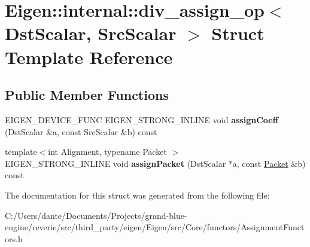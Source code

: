 \hypertarget{struct_eigen_1_1internal_1_1div__assign__op}{}\section{Eigen\+::internal\+::div\+\_\+assign\+\_\+op$<$ Dst\+Scalar, Src\+Scalar $>$ Struct Template Reference}
\label{struct_eigen_1_1internal_1_1div__assign__op}
\subsection*{Public Member Functions}
\begin{DoxyCompactItemize}
\item 
\mbox{\label{struct_eigen_1_1internal_1_1div__assign__op_a66eda20f8694f3a1c87cd6b755ccd9fc}} 
E\+I\+G\+E\+N\+\_\+\+D\+E\+V\+I\+C\+E\+\_\+\+F\+U\+NC E\+I\+G\+E\+N\+\_\+\+S\+T\+R\+O\+N\+G\+\_\+\+I\+N\+L\+I\+NE void {\bfseries assign\+Coeff} (Dst\+Scalar \&a, const Src\+Scalar \&b) const
\item 
\mbox{\label{struct_eigen_1_1internal_1_1div__assign__op_ab402e9f7ccc414aeca72663a7a7a90c8}} 
{\footnotesize template$<$int Alignment, typename Packet $>$ }\\E\+I\+G\+E\+N\+\_\+\+S\+T\+R\+O\+N\+G\+\_\+\+I\+N\+L\+I\+NE void {\bfseries assign\+Packet} (Dst\+Scalar $\ast$a, const \mbox{\hyperlink{union_eigen_1_1internal_1_1_packet}{Packet}} \&b) const
\end{DoxyCompactItemize}


The documentation for this struct was generated from the following file\+:\begin{DoxyCompactItemize}
\item 
C\+:/\+Users/dante/\+Documents/\+Projects/grand-\/blue-\/engine/reverie/src/third\+\_\+party/eigen/\+Eigen/src/\+Core/functors/Assignment\+Functors.\+h\end{DoxyCompactItemize}
